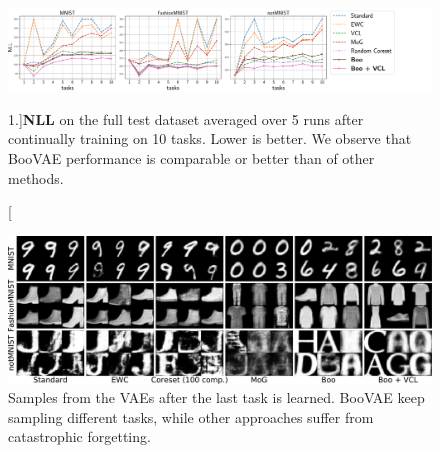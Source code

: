  \begin{figure}[t]
	\centering
	\baselineskip
		\includegraphics[width=1.1\textwidth]{pics/1_boovae/nll_mnists.pdf}
	\caption[][1.\baselineskip]{\textbf{NLL} on the full test dataset averaged over 5 runs after continually training on 10 tasks. Lower is better. We observe that BooVAE performance is comparable or better than of other methods.}\label{fig:online:NLL} 
	     \vspace*{-1.5\baselineskip}
\end{figure}

\begin{figure}[t]
		\centering
		\includegraphics[width=\textwidth]{pics/1_boovae/MNISTSGEN.pdf}
	\caption{Samples from the VAEs after the last task is learned. BooVAE keep sampling different tasks, while other approaches suffer from catastrophic forgetting.}
	\label{fig:MNISTSGEN}
\end{figure}
